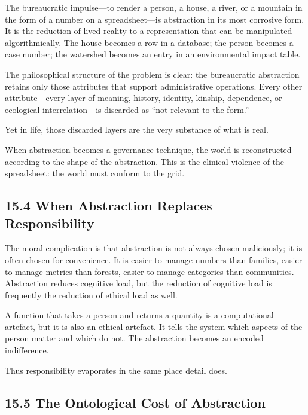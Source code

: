 \documentclass[12pt,letterpaper]{article}
\theoremstyle{remark}
\begin{document}
The bureaucratic impulse—to render a person, a house, a river, or a mountain in the form of a number on a spreadsheet—is abstraction in its most corrosive form. It is the reduction of lived reality to a representation that can be manipulated algorithmically. The house becomes a row in a database; the person becomes a case number; the watershed becomes an entry in an environmental impact table.

The philosophical structure of the problem is clear: the bureaucratic abstraction retains only those attributes that support administrative operations. Every other attribute—every layer of meaning, history, identity, kinship, dependence, or ecological interrelation—is discarded as ``not relevant to the form.''

Yet in life, those discarded layers are the very substance of what is real.

When abstraction becomes a governance technique, the world is reconstructed according to the shape of the abstraction. This is the clinical violence of the spreadsheet: the world must conform to the grid.

\subsection{15.4 When Abstraction Replaces Responsibility}

The moral complication is that abstraction is not always chosen maliciously; it is often chosen for convenience. It is easier to manage numbers than families, easier to manage metrics than forests, easier to manage categories than communities. Abstraction reduces cognitive load, but the reduction of cognitive load is frequently the reduction of ethical load as well.

A function that takes a person and returns a quantity is a computational artefact, but it is also an ethical artefact. It tells the system which aspects of the person matter and which do not. The abstraction becomes an encoded indifference.

Thus responsibility evaporates in the same place detail does.

\subsection{15.5 The Ontological Cost of Abstraction}
\end{document}
